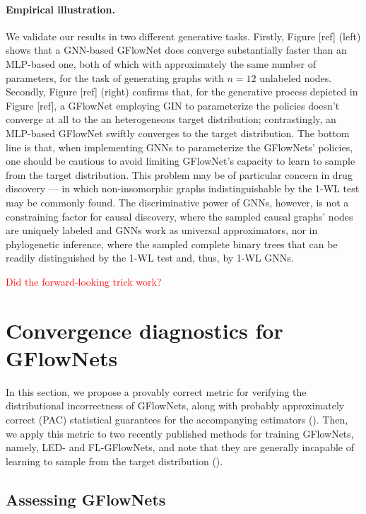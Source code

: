 \documentclass{article}
\theoremstyle{plain}
\theoremstyle{definition}
\theoremstyle{remark}
\theoremstyle{remark}
\begin{document}
\paragraph{Empirical illustration.} We validate our results in two different generative tasks. Firstly, Figure [ref] (left) shows that a GNN-based GFlowNet does converge substantially faster than an MLP-based one, both of which with approximately the same number of parameters, for the task of generating graphs with $n = 12$ unlabeled nodes. Secondly, Figure [ref] (right) confirms that, for the generative process depicted in Figure [ref], a GFlowNet employing GIN to parameterize the policies doesn't converge at all to the an heterogeneous target distribution; contrastingly, an MLP-based GFlowNet swiftly converges to the target distribution. The bottom line is that, when implementing GNNs to parameterize the GFlowNets' policies, one should be cautious to avoid limiting GFlowNet's capacity to learn to sample from the target distribution. This problem may be of particular concern in drug discovery --- in which non-insomorphic graphs indistinguishable by the 1-WL test may be commonly found. The discriminative power of GNNs, however, is not a constraining factor for causal discovery, where the sampled causal graphs' nodes are uniquely labeled and GNNs work as universal approximators, nor in phylogenetic inference, where the sampled complete binary trees that can be readily distinguished by the 1-WL test and, thus, by 1-WL GNNs. 

\textcolor{red}{Did the forward-looking trick work?}


\newpage

\section{Convergence diagnostics for GFlowNets} \label{sec:cov}  

In this section, we propose a provably correct metric for verifying the distributional incorrectness of GFlowNets, along with probably approximately correct (PAC) statistical guarantees for the accompanying estimators (). Then, we apply this metric to two recently published methods for training GFlowNets, namely, LED- and FL-GFlowNets, and note that they are generally incapable of learning to sample from the target distribution (). 

\subsection{Assessing GFlowNets} \label{sec:assgfn}
\end{document}
